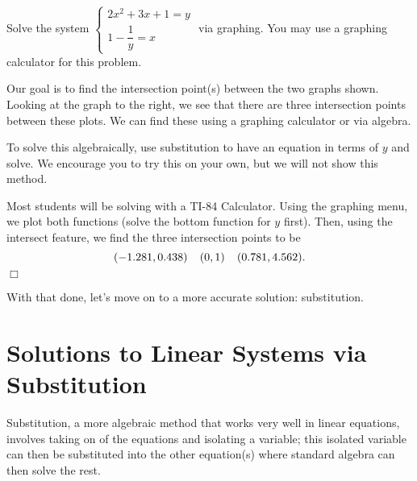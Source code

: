 \documentclass[lang=en,11pt]{elegantbook}
\begin{document}
\begin{example}
Solve the system $\begin{cases} 2x^2+3x+1=y \\ 1-\dfrac{1}{y}=x \end{cases}$ via graphing.  You may use a graphing calculator for this problem.
\end{example}
\begin{solution}
Our goal is to find the intersection point(s) between the two graphs shown.  Looking at the graph to the right, we see that there are three intersection points between these plots.  We can find these using a graphing calculator or via algebra.  

To solve this algebraically, use substitution to have an equation in terms of $y$ and solve.  We encourage you to try this on your own, but we will not show this method.  

Most students will be solving with a TI-84 Calculator.  Using the graphing menu, we plot both functions (solve the bottom function for $y$ first).  Then, using the intersect feature, we find the three intersection points to be $$(-1.281,0.438) \hspace{0.15in} (0,1) \hspace{0.15in} (0.781, 4.562).$$ $\Box$
\end{solution}
With that done, let's move on to a more accurate solution: substitution.
\section{Solutions to Linear Systems via Substitution}
Substitution, a more algebraic method that works very well in linear equations, involves taking on of the equations and isolating a variable; this isolated variable can then be substituted into the other equation(s) where standard algebra can then solve the rest.  
\end{document}
